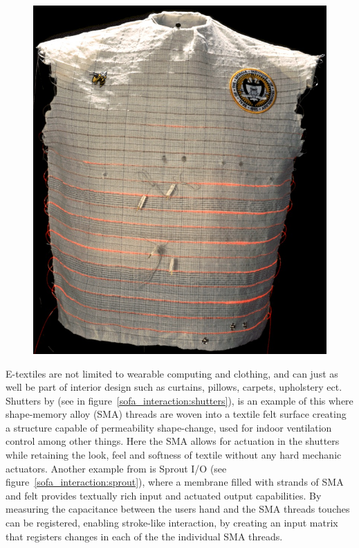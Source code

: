 \begin{figure}[h]
  \centering
  \begin{minipage}[b]{.7\textwidth}
    \centering
    \includegraphics[width=.5\linewidth]{figures/touch/wearable_motherboard}
  \label{sofa_interaction:wearable_motherboard}
  \end{minipage}
\end{figure}

E-textiles are not limited to wearable computing and clothing, and can just as well be part of interior design such as curtains, pillows, carpets, upholstery ect.
Shutters by \citet{coelho2009shutters} (see in figure~\ref{sofa_interaction:shutters}), is an example of this where shape-memory alloy (SMA) threads are woven into a textile felt surface creating a structure capable of permeability shape-change, used for indoor ventilation control among other things.
Here the SMA allows for actuation in the shutters while retaining the look, feel and softness of textile without any hard mechanic actuators.  
Another example from \citet{coelho2008sprout} is Sprout I/O (see figure~\ref{sofa_interaction:sprout}), where a membrane filled with strands of SMA and felt provides textually rich input and actuated output capabilities.
By measuring the capacitance between the users hand and the SMA threads touches can be registered, enabling stroke-like interaction, by creating an input matrix that registers changes in each of the the individual SMA threads.

